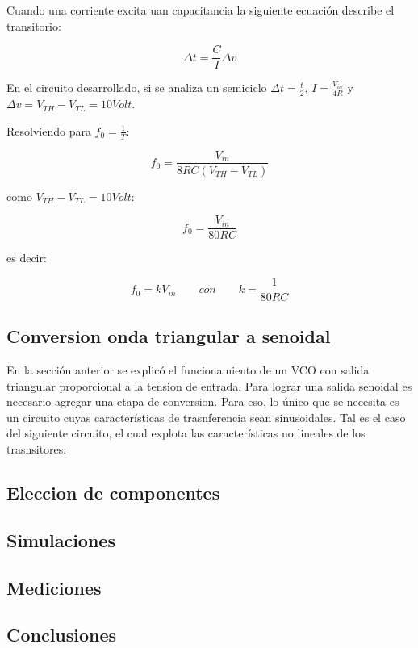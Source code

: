 Cuando una corriente excita uan capacitancia la siguiente ecuación describe el transitorio:

\begin{equation}
\Delta t = \frac{C}{I}\Delta v
\end{equation}

En el circuito desarrollado, si se analiza un semiciclo $\Delta t = \frac{t}{2}$, $I = \frac{V_{in}}{4R}$ y $\Delta v = V_{TH} - V_{TL} = 10  Volt$.

Resolviendo para $f_0 = \frac{1}{T}$:

\begin{equation}
f_0 = \frac{V_{in}}{8RC(V_{TH} - V_{TL})}
\end{equation}

como $V_{TH} - V_{TL} = 10  Volt$:

\begin{equation}
f_0 = \frac{V_{in}}{80RC}
\end{equation}

es decir:

\begin{equation}
f_0 = kV_{in} \qquad con \qquad k = \frac{1}{80RC}
\end{equation}


\subsection{Conversion onda triangular a senoidal}
En la sección anterior se explicó el funcionamiento de un VCO con salida triangular proporcional a la tension de entrada. Para lograr una salida senoidal es necesario agregar una etapa de conversion. Para eso, lo único que se necesita es un circuito cuyas características de trasnferencia sean sinusoidales. Tal es el caso del siguiente circuito, el cual explota las características no lineales de los trasnsitores:








\subsection{Eleccion de componentes}




\subsection{Simulaciones}

\subsection{Mediciones}

\subsection{Conclusiones}









